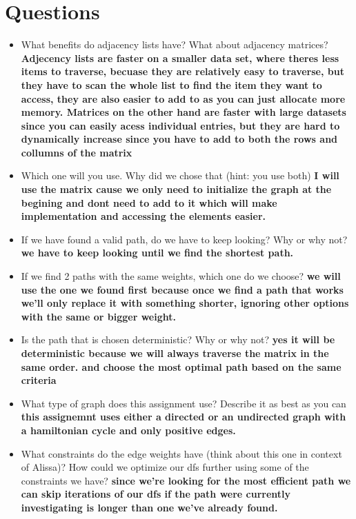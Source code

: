 \documentclass{article}
\begin{document}
\section*{Questions}
\begin{itemize}
    \item What benefits do adjacency lists have? What about adjacency matrices? \textbf{Adjecency lists are faster on a smaller data set, where theres less items to traverse, becuase they are relatively easy to traverse, but they have to scan the whole list to find the item they want to access, they are also easier to add to as you can just allocate more memory. Matrices on the other hand are faster with large datasets since you can easily acess individual entries, but they are hard to dynamically increase since you have to add to both the rows and collumns of the matrix }
    \item Which one will you use. Why did we chose that (hint: you use both) \textbf{I will use the matrix cause we only need to initialize the graph at the begining and dont need to add to it which will make implementation and accessing the elements easier.}
    \item If we have found a valid path, do we have to keep looking? Why or why not? \textbf{we have to keep looking until we find the shortest path.}
    \item If we find 2 paths with the same weights, which one do we choose? \textbf{we will use the one we found first because once we find a path that works we'll only replace it with something shorter, ignoring other options with the same or bigger weight.}
    \item Is the path that is chosen deterministic? Why or why not? \textbf{yes it will be deterministic because we will always traverse the matrix in the same order. and choose the most optimal path based on the same criteria}
    \item What type of graph does this assignment use? Describe it as best as you can \textbf{this assignemnt uses either a directed or an undirected graph with a hamiltonian cycle and only positive edges.} 
    \item What constraints do the edge weights have (think about this one in context of Alissa)? How could we optimize our dfs further using some of the constraints we have? \textbf{since we're looking for the most efficient path we can skip iterations of our dfs if the path were currently investigating is longer than one we've already found.}
    
\end{itemize}
\end{document}
